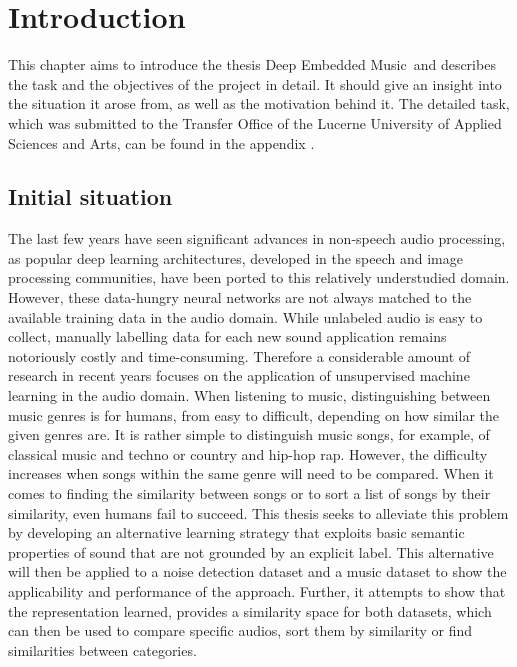 \chapter{Introduction}
\label{ch:Introduction}
This chapter aims to introduce the thesis \flqq Deep Embedded Music\frqq \ and describes the task and the objectives of the project in detail. It should give an insight into the situation it arose from, as well as the motivation behind it. The detailed task, which was submitted to the Transfer Office of the Lucerne University of Applied Sciences and Arts, can be found in the appendix .

\section{Initial situation}
\label{sub:Initial-Stituation}
The last few years have seen significant advances in non-speech audio processing, as popular deep learning architectures, developed in the speech and image processing communities, have been ported to this relatively understudied domain. However, these data-hungry neural networks are not always matched to the available training data in the audio domain. While unlabeled audio is easy to collect, manually labelling data for each new sound application remains notoriously costly and time-consuming. Therefore a considerable amount of research in recent years focuses on the application of unsupervised machine learning in the audio domain.
\newline
\newline
When listening to music, distinguishing between music genres is for humans, from easy to difficult, depending on how similar the given genres are. It is rather simple to distinguish music songs, for example, of classical music and techno or country and hip-hop rap. However, the difficulty increases when songs within the same genre will need to be compared. When it comes to finding the similarity between songs or to sort a list of songs by their similarity, even humans fail to succeed. 
\newline
\newline
This thesis seeks to alleviate this problem by developing an alternative learning strategy that exploits basic semantic properties of sound that are not grounded by an explicit label. This alternative will then be applied to a noise detection dataset and a music dataset to show the applicability and performance of the approach. Further, it attempts to show that the representation learned, provides a similarity space for both datasets, which can then be used to compare specific audios, sort them by similarity or find similarities between categories.

